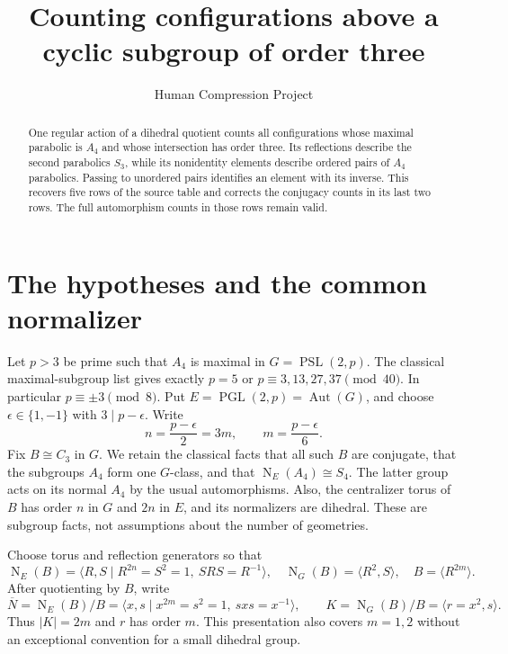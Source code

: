 \documentclass[11pt]{article}
\title{Counting configurations above a cyclic subgroup of order three}
\author{Human Compression Project}\date{}
\newcommand{\PSL}{\operatorname{PSL}}
\newcommand{\PGL}{\operatorname{PGL}}
\newcommand{\N}{\operatorname{N}}
\begin{document}
\maketitle
\begin{abstract}
One regular action of a dihedral quotient counts all configurations
whose maximal parabolic is $A_4$ and whose intersection has order three.
Its reflections describe the second parabolics $S_3$, while its nonidentity
elements describe ordered pairs of $A_4$ parabolics. Passing to unordered
pairs identifies an element with its inverse. This recovers five rows
of the source table and corrects the conjugacy counts in its last two
rows. The full automorphism counts in those rows remain valid.
\end{abstract}

\section{The hypotheses and the common normalizer}
Let $p>3$ be prime such that $A_4$ is maximal in $G=\PSL(2,p)$.
The classical maximal-subgroup list gives exactly $p=5$ or
$p\equiv3,13,27,37\pmod {40}$. In particular $p\equiv\pm3\pmod8$.
Put $E=\PGL(2,p)=\operatorname{Aut}(G)$, and choose
$\epsilon\in\{1,-1\}$ with $3\mid p-\epsilon$. Write
\[
 n=\frac{p-\epsilon}{2}=3m,\qquad m=\frac{p-\epsilon}{6}.
\]
Fix $B\cong C_3$ in $G$. We retain the classical facts that all
such $B$ are conjugate, that the subgroups $A_4$ form one $G$-class,
and that $\N_E(A_4)\cong S_4$. The latter group acts on its normal
$A_4$ by the usual automorphisms. Also, the centralizer torus of $B$
has order $n$ in $G$ and $2n$ in $E$, and its normalizers are dihedral.
These are subgroup facts, not assumptions about the number of geometries.

Choose torus and reflection generators so that
\[
 \N_E(B)=\langle R,S\mid R^{2n}=S^2=1,\ SRS=R^{-1}\rangle,
 \quad \N_G(B)=\langle R^2,S\rangle,
 \quad B=\langle R^{2m}\rangle.
\]
After quotienting by $B$, write
\[
 \overline N=\N_E(B)/B=\langle x,s\mid x^{2m}=s^2=1,
 \ sxs=x^{-1}\rangle,
 \qquad K=\N_G(B)/B=\langle r=x^2,s\rangle.
\]
Thus $|K|=2m$ and $r$ has order $m$. This presentation also covers
$m=1,2$ without an exceptional convention for a small dihedral group.
\end{document}
